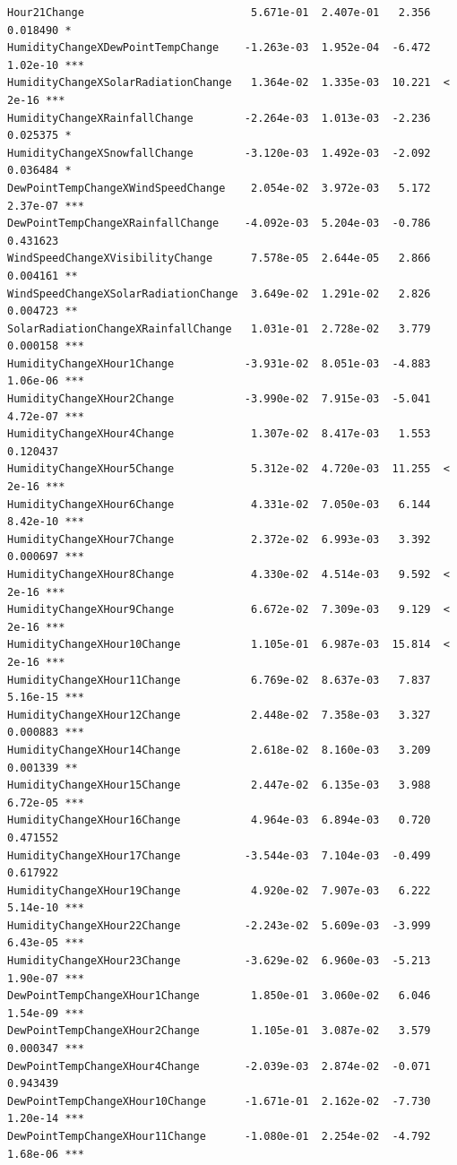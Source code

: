 \documentclass[
  letterpaper,
  DIV=11,
  numbers=noendperiod]{scrartcl}
\begin{document}
\begin{verbatim}
Hour21Change                          5.671e-01  2.407e-01   2.356 0.018490 *  
HumidityChangeXDewPointTempChange    -1.263e-03  1.952e-04  -6.472 1.02e-10 ***
HumidityChangeXSolarRadiationChange   1.364e-02  1.335e-03  10.221  < 2e-16 ***
HumidityChangeXRainfallChange        -2.264e-03  1.013e-03  -2.236 0.025375 *  
HumidityChangeXSnowfallChange        -3.120e-03  1.492e-03  -2.092 0.036484 *  
DewPointTempChangeXWindSpeedChange    2.054e-02  3.972e-03   5.172 2.37e-07 ***
DewPointTempChangeXRainfallChange    -4.092e-03  5.204e-03  -0.786 0.431623    
WindSpeedChangeXVisibilityChange      7.578e-05  2.644e-05   2.866 0.004161 ** 
WindSpeedChangeXSolarRadiationChange  3.649e-02  1.291e-02   2.826 0.004723 ** 
SolarRadiationChangeXRainfallChange   1.031e-01  2.728e-02   3.779 0.000158 ***
HumidityChangeXHour1Change           -3.931e-02  8.051e-03  -4.883 1.06e-06 ***
HumidityChangeXHour2Change           -3.990e-02  7.915e-03  -5.041 4.72e-07 ***
HumidityChangeXHour4Change            1.307e-02  8.417e-03   1.553 0.120437    
HumidityChangeXHour5Change            5.312e-02  4.720e-03  11.255  < 2e-16 ***
HumidityChangeXHour6Change            4.331e-02  7.050e-03   6.144 8.42e-10 ***
HumidityChangeXHour7Change            2.372e-02  6.993e-03   3.392 0.000697 ***
HumidityChangeXHour8Change            4.330e-02  4.514e-03   9.592  < 2e-16 ***
HumidityChangeXHour9Change            6.672e-02  7.309e-03   9.129  < 2e-16 ***
HumidityChangeXHour10Change           1.105e-01  6.987e-03  15.814  < 2e-16 ***
HumidityChangeXHour11Change           6.769e-02  8.637e-03   7.837 5.16e-15 ***
HumidityChangeXHour12Change           2.448e-02  7.358e-03   3.327 0.000883 ***
HumidityChangeXHour14Change           2.618e-02  8.160e-03   3.209 0.001339 ** 
HumidityChangeXHour15Change           2.447e-02  6.135e-03   3.988 6.72e-05 ***
HumidityChangeXHour16Change           4.964e-03  6.894e-03   0.720 0.471552    
HumidityChangeXHour17Change          -3.544e-03  7.104e-03  -0.499 0.617922    
HumidityChangeXHour19Change           4.920e-02  7.907e-03   6.222 5.14e-10 ***
HumidityChangeXHour22Change          -2.243e-02  5.609e-03  -3.999 6.43e-05 ***
HumidityChangeXHour23Change          -3.629e-02  6.960e-03  -5.213 1.90e-07 ***
DewPointTempChangeXHour1Change        1.850e-01  3.060e-02   6.046 1.54e-09 ***
DewPointTempChangeXHour2Change        1.105e-01  3.087e-02   3.579 0.000347 ***
DewPointTempChangeXHour4Change       -2.039e-03  2.874e-02  -0.071 0.943439    
DewPointTempChangeXHour10Change      -1.671e-01  2.162e-02  -7.730 1.20e-14 ***
DewPointTempChangeXHour11Change      -1.080e-01  2.254e-02  -4.792 1.68e-06 ***

\end{verbatim}
\end{document}
